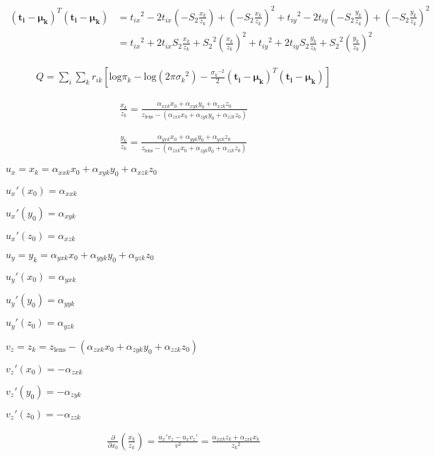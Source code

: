 \documentclass{article}
\begin{document}
\begin{align}
(\bm{t_i}-\bm{\mu_k})^T(\bm{t_i}-\bm{\mu_k}) &= {t_{ix}}^2 - 2t_{ix}\left(-S_2\frac{x_k}{z_{k}}\right) + \left(-S_2\frac{x_k}{z_{k}}\right)^2 + {t_{iy}}^2 - 2t_{iy}\left(-S_2\frac{y_k}{z_{k}}\right) + \left(-S_2\frac{y_k}{z_{k}}\right)^2 \\
&= {t_{ix}}^2 + 2t_{ix}S_2\frac{x_k}{z_{k}} + {S_2}^2\left(\frac{x_k}{z_{k}}\right)^2 + {t_{iy}}^2 + 2t_{iy}S_2\frac{y_k}{z_{k}} + {S_2}^2\left(\frac{y_k}{z_{k}}\right)^2
\end{align}


\begin{align}
Q = \sum_i \sum_k r_{ik} \left[ \text{log}\pi_k - \text{log}(2\pi{\sigma_k}^2) - \frac{{\sigma_k}^{-2}}{2}(\bm{t_i}-\bm{\mu_k})^T(\bm{t_i}-\bm{\mu_k}) \right]
\end{align}

\begin{align}
\frac{x_k}{z_k} = \frac{\alpha_{xxk}x_0 + \alpha_{xyk}y_0 + \alpha_{xzk}z_0}{z_\text{lens} - (\alpha_{zxk}x_0 + \alpha_{zyk}y_0 + \alpha_{zzk}z_0)}
\end{align}

\begin{align}
\frac{y_k}{z_k} = \frac{\alpha_{yxk}x_0 + \alpha_{yyk}y_0 + \alpha_{yzk}z_0}{z_\text{lens} - (\alpha_{zxk}x_0 + \alpha_{zyk}y_0 + \alpha_{zzk}z_0)}
\end{align}



$u_x = x_k = \alpha_{xxk}x_0 + \alpha_{xyk}y_0 + \alpha_{xzk}z_0$

${u_x}'(x_0) = \alpha_{xxk}$

${u_x}'(y_0) = \alpha_{xyk}$

${u_x}'(z_0) = \alpha_{xzk}$

$u_y = y_k = \alpha_{yxk}x_0 + \alpha_{yyk}y_0 + \alpha_{yzk}z_0$

${u_y}'(x_0) = \alpha_{yxk}$

${u_y}'(y_0) = \alpha_{yyk}$

${u_y}'(z_0) = \alpha_{yzk}$

$v_z = z_k = z_\text{lens} - (\alpha_{zxk}x_0 + \alpha_{zyk}y_0 + \alpha_{zzk}z_0)$

${v_z}'(x_0) = -\alpha_{zxk}$

${v_z}'(y_0) = -\alpha_{zyk}$

${v_z}'(z_0) = -\alpha_{zzk}$

\begin{align}
\frac{\partial}{\partial x_0}\left(\frac{x_k}{z_k}\right) = \frac{{u_x}'v_z -u_x{v_z}'}{v^2}  = \frac{\alpha_{xxk} z_k + \alpha_{zxk} x_k}{{z_k}^2}
\end{align}
\end{document}
